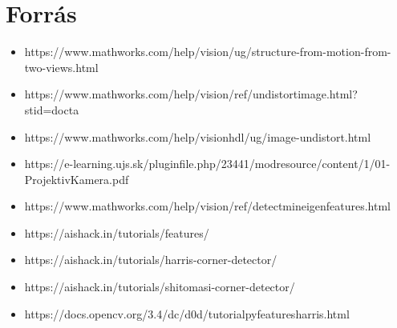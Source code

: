 \documentclass[12pt]{report}
\begin{document}
    \chapter{Forrás}
        \begin{itemize}
            \item https://www.mathworks.com/help/vision/ug/structure-from-motion-from-two-views.html
            \item https://www.mathworks.com/help/vision/ref/undistortimage.html?s\textunderscore tid=doc\textunderscore ta
            \item https://www.mathworks.com/help/visionhdl/ug/image-undistort.html
            \item https://e-learning.ujs.sk/pluginfile.php/23441/mod\textunderscore resource/content/1/01-ProjektivKamera.pdf
            \item https://www.mathworks.com/help/vision/ref/detectmineigenfeatures.html
            \item https://aishack.in/tutorials/features/
            \item https://aishack.in/tutorials/harris-corner-detector/
            \item https://aishack.in/tutorials/shitomasi-corner-detector/
            \item https://docs.opencv.org/3.4/dc/d0d/tutorial\textunderscore py\textunderscore features\textunderscore harris.html
        \end{itemize}
\end{document}
